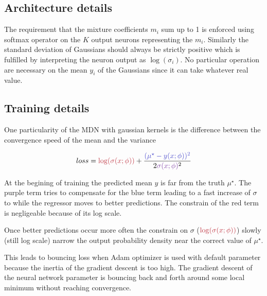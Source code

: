 \subsection{Architecture details} %
\label{sub:architecture_details}

The requirement that the mixture coefficients $m_i$ sum up to 1 is enforced using softmax operator on the $K$ output neurons representing the $m_i$.
Similarly the standard deviation of Gaussians should always be strictly positive which is fulfilled by interpreting the neuron output as $\log(\sigma_i)$.
No particular operation are necessary on the mean $y_i$ of the Gaussians since it can take whatever real value.







\subsection{Training details} %
\label{sub:training_details}

One particularity of the MDN with gaussian kernels is the difference between the convergence speed of the mean and the variance 

\begin{equation}
    loss = \textcolor{myred}{\log(\sigma(x;\phi))} + \frac{\textcolor{myblue}{(\mu^\star - y(x;\phi))^2}}{2\textcolor{mypurple}{\sigma(x;\phi)}^2}
\end{equation}

At the begining of training the predicted mean $y$ is far from the truth $\mu^\star$.
The \textcolor{mypurple}{purple} term tries to compensate for the \textcolor{myblue}{blue} term leading to a fast increase of $\sigma$ to while the regressor moves to better predictions.
The constrain of the \textcolor{myred}{red} term is negligeable because of its log scale.

Once better predictions occur more often the constrain on $\sigma$ ($\textcolor{myred}{\log(\sigma(x;\phi))}$) slowly (still log scale) narrow the output probability density near the correct value of $\mu^\star$.

This leads to bouncing loss when Adam optimizer \needcite is used with default parameter because the inertia of the gradient descent is too high.
The gradient descent of the neural network parameter is bouncing back and forth around some local minimum without reaching convergence.

